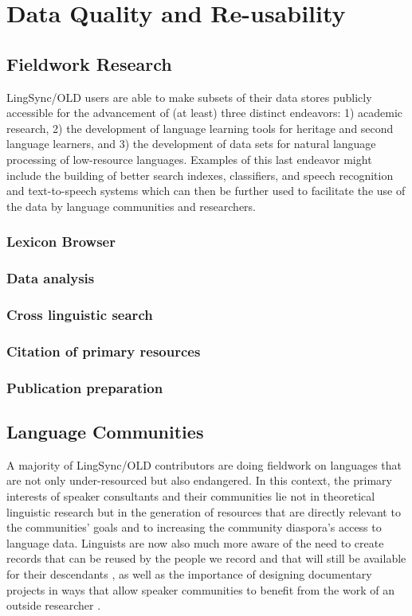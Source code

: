 \documentclass[11pt]{article}
\begin{document}
\section{Data Quality and Re-usability}
\label{open-data}


\subsection{Fieldwork Research}

LingSync/OLD users are able to make subsets of their data stores publicly
accessible for the advancement of (at least) three distinct endeavors: 1)
academic research, 2) the development of language learning tools for
heritage and second language learners, and 3) the development of data sets for
natural language processing of low-resource languages. Examples of this last
endeavor might include the building of better search indexes, classifiers,
and speech recognition and text-to-speech systems which can then be further
used to facilitate the use of the data by language communities and researchers.

\subsubsection{Lexicon Browser}
\subsubsection{Data analysis}
\subsubsection{Cross linguistic search}
\subsubsection{Citation of primary resources}
\subsubsection{Publication preparation}

\subsection{Language Communities}

A majority of LingSync/OLD contributors are doing fieldwork on languages that
are not only under-resourced but also endangered. In this context, the primary
interests of speaker consultants and their communities lie not in theoretical
linguistic research but in the generation of resources that are directly
relevant to the communities' goals and to increasing the community diaspora's
access to language data. Linguists are now also much more aware of the need to
create records that can be reused by the people we record and that will still be
available for their descendants \cite[p.129]{Thieberger:2012}, as well as the
importance of designing documentary projects in ways that allow speaker
communities to benefit from the work of an outside researcher \cite{Good:2012}.
\end{document}

